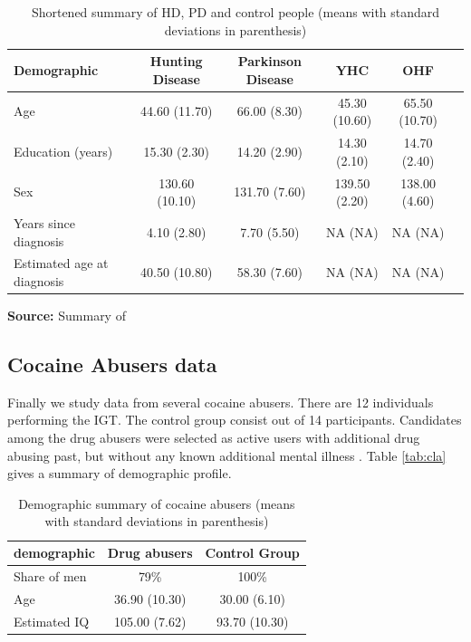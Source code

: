 \documentclass[12pt,a4paper,bibliography=totocnumbered,listof=totocnumbered]{scrartcl}
\begin{document}
\setlength{\tabcolsep}{10pt}
\renewcommand{\arraystretch}{1}
\begin{table}[!htbp]
	\centering 
	\scriptsize
	\begin{tabularx}{\textwidth}{lccccc}
		\toprule
		\textbf{Demographic} & \textbf{Hunting Disease} & \textbf{Parkinson Disease} & \textbf{YHC} & \textbf{OHF} \\
		\hline
		Age & 		44.60 (11.70) & 66.00 (8.30) & 45.30 (10.60) & 65.50 (10.70) \\
		Education (years) & 15.30 (2.30) & 14.20 (2.90) & 14.30 (2.10) &14.70 (2.40) \\
		Sex & 130.60 (10.10) & 131.70 (7.60) & 139.50 (2.20) & 138.00 (4.60) \\
		Years since diagnosis & 4.10 (2.80) & 7.70 (5.50) & NA (NA) & NA (NA) \\
		Estimated age at diagnosis & 40.50 (10.80) & 58.30 (7.60) & NA (NA) & NA (NA) \\
		\bottomrule
	\end{tabularx}
	\caption{Shortened summary of HD, PD and control people (means with standard deviations in parenthesis)}
	\label{tab:hus}
	\textbf{Source:} Summary of \cite[page 3]{Stout2001} 
\end{table}


\subsection{Cocaine Abusers data}

Finally we study data from several cocaine abusers. There are 12 individuals performing the IGT. The control group consist out of 14 participants. Candidates among the drug abusers were selected as active users with additional drug abusing past, but without any known additional mental illness \cite{stout2004}. Table \ref{tab:cla} gives a summary of demographic profile.

\setlength{\tabcolsep}{12pt}
\renewcommand{\arraystretch}{1}
\begin{table}[!htbp]
	\centering 
	\begin{tabular}{lcc}
		\toprule
		\textbf{demographic} & \textbf{Drug abusers} & \textbf{Control Group} \\
		\hline
		Share of men &  79\% & 100\%\\
		Age & 36.90 (10.30) & 30.00 (6.10) \\
		Estimated IQ & 105.00 (7.62) & 93.70 (10.30) \\
		\bottomrule
	\end{tabular}
	\caption{Demographic summary of cocaine abusers (means with standard deviations in parenthesis)}
	\label{tab:cocs}
\end{table}
\end{document}
